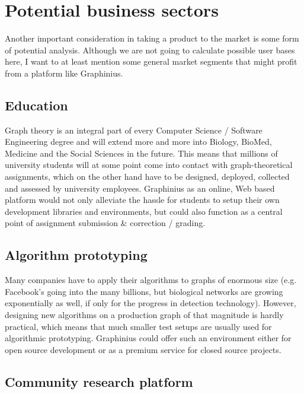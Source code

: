 \section{Potential business sectors}
\label{sect:business_sectors}

	Another important consideration in taking a product to the market is some form of potential analysis. Although we are not going to calculate possible user bases here, I want to at least mention some general market segments that might profit from a platform like Graphinius.

	\subsection{Education}
	\label{ssect:education}
	
	Graph theory is an integral part of every Computer Science / Software Engineering degree and will extend more and more into Biology, BioMed, Medicine and the Social Sciences in the future. This means that millions of university students will at some point come into contact with graph-theoretical assignments, which on the other hand have to be designed, deployed, collected and assessed by university employees. Graphinius as an online, Web based platform would not only alleviate the hassle for students to setup their own development libraries and environments, but could also function as a central point of assignment submission \& correction / grading. 
	
	\subsection{Algorithm prototyping}
	\label{ssect:algo_proto}
	
	Many companies have to apply their algorithms to graphs of enormous size (e.g. Facebook's going into the many billions, but biological networks are growing exponentially as well, if only for the progress in detection technology). However, designing new algorithms on a production graph of that magnitude is hardly practical, which means that much smaller test setups are usually used for algorithmic prototyping. Graphinius could offer such an environment either for open source development or as a premium service for closed source projects.
	
	\subsection{Community research platform}
	\label{ssect:research}
	
